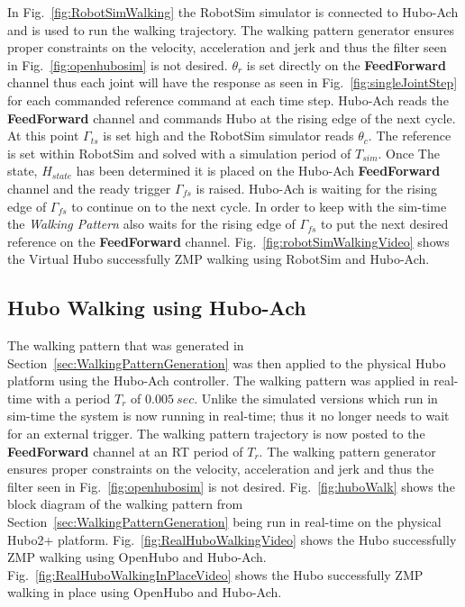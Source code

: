 In Fig.~\ref{fig:RobotSimWalking} the RobotSim simulator is connected to Hubo-Ach and is used to run the walking trajectory.  
The walking pattern generator ensures proper constraints on the velocity, acceleration and jerk and thus the filter seen in Fig.~\ref{fig:openhubosim} is not desired.  
$\theta_r$ is set directly on the \textbf{FeedForward} channel thus each joint will have the response as seen in Fig.~\ref{fig:singleJointStep} for each commanded reference command at each time step.
Hubo-Ach reads the \textbf{FeedForward} channel and commands Hubo at the rising edge of the next cycle.  
At this point $\Gamma_{ts}$ is set high and the RobotSim simulator reads $\theta_c$.  
The reference is set within RobotSim and solved with a simulation period of $T_{sim}$.  
Once The state, $H_{state}$ has been determined it is placed on the Hubo-Ach \textbf{FeedForward} channel and the ready trigger $\Gamma_{fs}$ is raised.  
Hubo-Ach is waiting for the rising edge of $\Gamma_{fs}$ to continue on to the next cycle.  
In order to keep with the sim-time the \textit{Walking Pattern} also waits for the rising edge of $\Gamma_{fs}$ to put the next desired reference on the \textbf{FeedForward} channel.
Fig.~\ref{fig:robotSimWalkingVideo} shows the Virtual Hubo successfully ZMP walking using RobotSim and Hubo-Ach.







\subsection{Hubo Walking using Hubo-Ach}\label{sec:HuboWalking}
The walking pattern that was generated in Section~\ref{sec:WalkingPatternGeneration} was then applied to the physical Hubo platform using the Hubo-Ach controller.
The walking pattern was applied in real-time with a period $T_r$ of $0.005~sec$.
Unlike the simulated versions which run in sim-time the system is now running in real-time; thus it no longer needs to wait for an external trigger.
The walking pattern trajectory is now posted to the \textbf{FeedForward} channel at an RT period of $T_r$.
The walking pattern generator ensures proper constraints on the velocity, acceleration and jerk and thus the filter seen in Fig.~\ref{fig:openhubosim} is not desired.
Fig.~\ref{fig:huboWalk} shows the block diagram of the walking pattern from Section~\ref{sec:WalkingPatternGeneration} being run in real-time on the physical Hubo2+ platform.
Fig.~\ref{fig:RealHuboWalkingVideo} shows the Hubo successfully ZMP walking using OpenHubo and Hubo-Ach.
Fig.~\ref{fig:RealHuboWalkingInPlaceVideo} shows the Hubo successfully ZMP walking in place using OpenHubo and Hubo-Ach.


